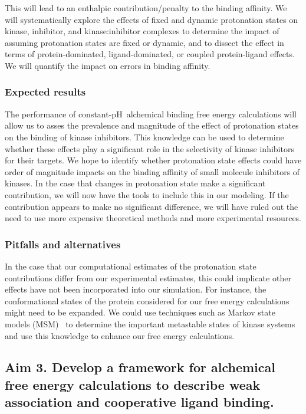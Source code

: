 \documentclass[10pt,final]{article}
\newcommand{\pH}{p$\mathrm{H}$\ }
\begin{document}
This will lead to an enthalpic contribution/penalty to the binding affinity.
%
We will systematically explore the effects of fixed and dynamic protonation states on kinase, inhibitor, and kinase:inhibitor complexes to determine the impact of assuming protonation states are fixed or dynamic, and to dissect the effect in terms of protein-dominated, ligand-dominated, or coupled protein-ligand effects.
%
We will quantify the impact on errors in binding affinity.

\subsubsection*{Expected results}
The performance of constant-\pH alchemical binding free energy calculations will allow us to asses the prevalence and magnitude of the effect of protonation states on the binding of kinase inhibitors.
%
This knowledge can be used to determine whether these effects play a significant role in the selectivity of kinase inhibitors for their targets.
%
We hope to identify whether protonation state effects could have order of magnitude impacts on the binding affinity of small molecule inhibitors of kinases.
%
In the case that changes in protonation state make a significant contribution, we will now have the tools to include this in our modeling.
%
If the contribution appears to make no significant difference, we will have ruled out the need to use more expensive theoretical methods and more experimental resources.


\subsubsection*{Pitfalls and alternatives}
In the case that our computational estimates of the protonation state contributions differ from our experimental estimates, this could implicate other effects have not been incorporated into our simulation. 
%
For instance, the conformational states of the protein considered for our free energy calculations might need to be expanded.
%
We could use techniques such as Markov state models (MSM)~\autocite{Prinz2011a} to determine the important metastable states of kinase systems and use this knowledge to enhance our free energy calculations.
\subsection*{Aim 3. Develop a framework for alchemical free energy calculations to describe weak association and cooperative ligand binding.}
\end{document}
